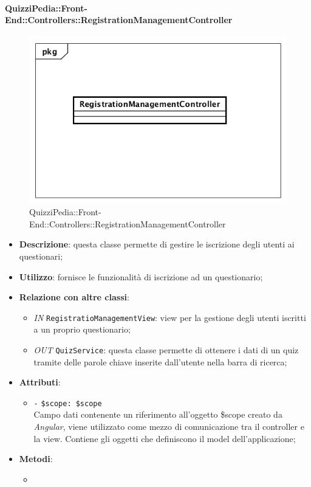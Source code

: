\paragraph{QuizziPedia::Front-End::Controllers::RegistrationManagementController}
\begin{figure} [ht]
	\centering
	\includegraphics[scale=0.45]{UML/Classi/Front-End/QuizziPedia_Front-end_Controller_RegistrationManagementController.png}
	\caption{QuizziPedia::Front-End::Controllers::RegistrationManagementController}
\end{figure} \FloatBarrier
\begin{itemize}
	\item \textbf{Descrizione}: questa classe permette di gestire le iscrizione degli utenti ai questionari;
	\item \textbf{Utilizzo}: fornisce le funzionalità di iscrizione ad un questionario;
	\item \textbf{Relazione con altre classi}:
	\begin{itemize}
		\item \textit{IN} \texttt{RegistratioManagementView}: view per la gestione degli utenti iscritti a un proprio questionario; 
		\item \textit{OUT} \texttt{QuizService}: questa classe permette di ottenere i dati di un quiz tramite delle parole chiave inserite dall'utente nella barra di ricerca;
	\end{itemize}
	\item \textbf{Attributi}:
	\begin{itemize}
		\item \texttt{-} \texttt{\$scope: \$scope} \\
		Campo dati contenente un riferimento all’oggetto \$scope creato da \textit{Angular}, viene utilizzato come mezzo di comunicazione tra il controller e la view. Contiene gli oggetti che definiscono il model dell’applicazione;
	\end{itemize}
	\item \textbf{Metodi}:
	\begin{itemize}
		\item 
	\end{itemize}
\end{itemize}

